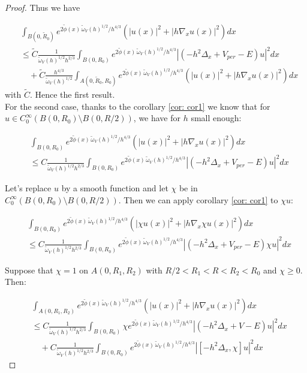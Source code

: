 \documentclass[leqno,11pt,letterpaper, english]{amsart}
\newcommand{\nn}{\nonumber}
\theoremstyle{plain}
\theoremstyle{definition}
\numberwithin{equation}{section}
\begin{document}
\begin{proof}
Thus we have

\begin{align}
    &\int_{B(0,\tilde{R}_0)} e^{2\tilde{\phi}(x)\,\tilde{\omega}_V(h)^{1/2}/ h^{4/3}} (|u(x)|^2 +|h\nabla_x u(x)|^2)dx\nn\\
    &\leq \tilde{C} \frac{1}{\tilde{\omega}_V(h)^{1/2}h^{2/3}}\int_{B(0,R_0)} e^{2\tilde{\phi}(x)\,\tilde{\omega}_V(h)^{1/2}/ h^{4/3}}|(-h^2\Delta_x + V_{per}- E)u|^2dx\nn\\
    &\quad +\tilde{C} \frac{h^{4/3}}{\tilde{\omega}_V(h)^{1/2}}\int_{A(0,\tilde{R}_0,R_0)} e^{2\tilde{\phi}(x)\,\tilde{\omega}_V(h)^{1/2}/ h^{4/3}} (|u(x)|^2 +|h\nabla_x u(x)|^2)dx
\end{align}
with $\tilde{C}$. Hence the first result.\\
For the second case, thanks to the corollary \ref{cor: cor1} we know that for $u \in C_0^\infty(B(0,R_0)\setminus B(0,R/2))$, we have for $h$ small enough:

\begin{align}
    &\int_{B(0,R_0)} e^{2\tilde{\phi}(x)\,\tilde{\omega}_V(h)^{1/2}/ h^{4/3}} (|u(x)|^2 +|h\nabla_x u(x)|^2)dx\nn\\
    &\leq C \frac{1}{\tilde{\omega}_V(h)^{1/2}h^{2/3}}\int_{B(0,R_0)} e^{2\tilde{\phi}(x)\,\tilde{\omega}_V(h)^{1/2}/ h^{4/3}}|(-h^2\Delta_x + V_{per}- E)u|^2dx
\end{align}

Let's replace $u$ by a smooth function and let $\chi$ be in $ C_0^\infty(B(0,R_0)\setminus B(0,R/2))$. Then we can apply corollary \ref{cor: cor1} to $\chi u$:

\begin{align}
    &\int_{B(0,R_0)} e^{2\tilde{\phi}(x)\,\tilde{\omega}_V(h)^{1/2}/ h^{4/3}} (|\chi u(x)|^2 +|h\nabla_x \chi u(x)|^2)dx\nn\\
    &\leq C \frac{1}{\tilde{\omega}_V(h)^{1/2}h^{2/3}}\int_{B(0,R_0)} e^{2\tilde{\phi}(x)\,\tilde{\omega}_V(h)^{1/2}/ h^{4/3}}|(-h^2\Delta_x + V_{per}- E)\chi u|^2dx
\end{align}

Suppose that $\chi=1$ on $A(0,R_1,R_2)$ with $R/2<R_1<R<R_2<R_0$ and $\chi\geq 0$. Then:

\begin{align}
    &\int_{A(0,R_1,R_2)} e^{2\tilde{\phi}(x)\,\tilde{\omega}_V(h)^{1/2}/ h^{4/3}} ( |u(x)|^2 +|h\nabla_x u(x)|^2)dx\nn\\
    &\leq C \frac{1}{\tilde{\omega}_V(h)^{1/2}h^{2/3}}\int_{B(0,R_0)} \chi e^{2\tilde{\phi}(x)\,\tilde{\omega}_V(h)^{1/2}/ h^{4/3}}|(-h^2\Delta_x + V- E) u|^2dx\nn\\
    &\quad + C \frac{1}{\tilde{\omega}_V(h)^{1/2}h^{2/3}}\int_{B(0,R_0)} e^{2\tilde{\phi}(x)\,\tilde{\omega}_V(h)^{1/2}/ h^{4/3}}|[-h^2\Delta_x ,\chi] u|^2dx
\end{align}


\end{proof}
\end{document}
